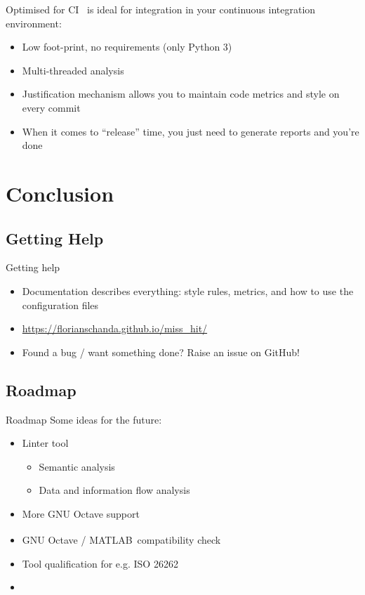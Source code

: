 \documentclass{beamer}
\newcommand{\mh}[0]{{\sc\structure{Miss\_Hit}}}
\newcommand{\matlab}[0]{MATLAB\textsuperscript{\tiny\textregistered}}
\begin{document}
\begin{frame}{Optimised for CI}
  \mh~is ideal for integration in your continuous integration
  environment:
  \begin{itemize}
  \item Low foot-print, no requirements (only Python 3)
  \item Multi-threaded analysis
  \item Justification mechanism allows you to maintain code metrics
    and style on every commit
  \item When it comes to ``release'' time, you just need to generate
    reports and you're done
  \end{itemize}
\end{frame}

\section{Conclusion}
\subsection{Getting Help}
\begin{frame}{Getting help}
  \begin{itemize}
  \item Documentation describes everything: style rules, metrics, and
    how to use the configuration files
  \item \url{https://florianschanda.github.io/miss_hit/}
    \pause
  \item Found a bug / want something done? Raise an issue on GitHub!
  \end{itemize}
\end{frame}

\subsection{Roadmap}
\begin{frame}{Roadmap}
  Some ideas for the future:
  \begin{itemize}
  \item Linter tool
    \begin{itemize}
    \item Semantic analysis
    \item Data and information flow analysis
    \end{itemize}
  \item More GNU Octave support
  \item GNU Octave / \matlab\ compatibility check
  \item Tool qualification for e.g. ISO 26262
    \pause
  \item {}
  \end{itemize}
\end{frame}
\end{document}
